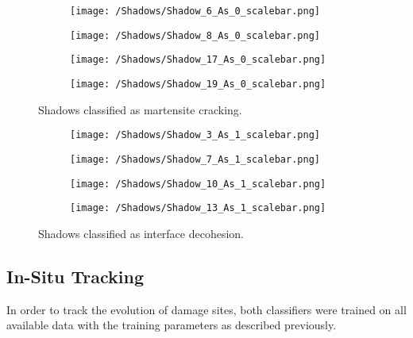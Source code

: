 \begin{figure}[H]
\centering
\begin{subfigure}{0.24\textwidth}
\texttt{[image: /Shadows/Shadow\_6\_As\_0\_scalebar.png]}
\caption{}
\end{subfigure}
\centering
\begin{subfigure}{0.24\textwidth}
\texttt{[image: /Shadows/Shadow\_8\_As\_0\_scalebar.png]}
\caption{}
\end{subfigure}
\centering
\begin{subfigure}{0.24\textwidth}
\texttt{[image: /Shadows/Shadow\_17\_As\_0\_scalebar.png]}
\caption{}
\end{subfigure}
\centering
\begin{subfigure}{0.24\textwidth}
\texttt{[image: /Shadows/Shadow\_19\_As\_0\_scalebar.png]}
\caption{}
\end{subfigure}
\caption{Shadows classified as martensite cracking.}
\label{fig:shadowAsMC}
\end{figure}

\begin{figure}[H]
\centering
\begin{subfigure}{0.24\textwidth}
\texttt{[image: /Shadows/Shadow\_3\_As\_1\_scalebar.png]}
\caption{}
\end{subfigure}
\centering
\begin{subfigure}{0.24\textwidth}
\texttt{[image: /Shadows/Shadow\_7\_As\_1\_scalebar.png]}
\caption{}
\end{subfigure}
\centering
\begin{subfigure}{0.24\textwidth}
\texttt{[image: /Shadows/Shadow\_10\_As\_1\_scalebar.png]}
\caption{}
\end{subfigure}
\centering
\begin{subfigure}{0.24\textwidth}
\texttt{[image: /Shadows/Shadow\_13\_As\_1\_scalebar.png]}
\caption{}
\end{subfigure}
\caption{Shadows classified as interface decohesion.}
\label{fig:shadowAsID}
\end{figure}


\subsection{In-Situ Tracking}
\label{sec:InSituTracking}
In order to track the evolution of damage sites, both classifiers were trained on all available data with the training parameters as described previously. \\

